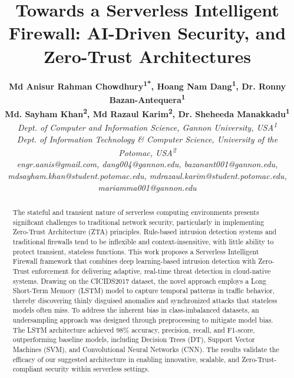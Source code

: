 \documentclass[conference]{IEEEtran}
\begin{document}
\title{Towards a Serverless Intelligent Firewall: AI-Driven Security, and Zero-Trust Architectures}

\author{
\centering
\begin{tabular}{c}
\textbf{Md Anisur Rahman Chowdhury\textsuperscript{1*}, Hoang Nam Dang\textsuperscript{1}, Dr. Ronny Bazan-Antequera\textsuperscript{1}} \\
\textbf{Md. Sayham Khan\textsuperscript{2}, Md Razaul Karim\textsuperscript{2}, Dr. Sheheeda Manakkadu\textsuperscript{1}} \\[6pt]
\textit{Dept. of Computer and Information Science, Gannon University, USA\textsuperscript{1}} \\
\textit{Dept. of Information Technology \& Computer Science, University of the Potomac, USA\textsuperscript{2}} \\[10pt]
\textit{\small engr.aanis@gmail.com, dang004@gannon.edu, bazanant001@gannon.edu,}\\
\textit{\small mdsayham.khan@student.potomac.edu, mdrazaul.karim@student.potomac.edu, mariamma001@gannon.edu}
\end{tabular}
}


\maketitle

\begin{abstract}
The stateful and transient nature of serverless computing environments presents significant challenges to traditional network security, particularly in implementing Zero-Trust Architecture (ZTA) principles. Rule-based intrusion detection systems and traditional firewalls tend to be inflexible and context-insensitive, with little ability to protect transient, stateless functions. This work proposes a Serverless Intelligent Firewall framework that combines deep learning-based intrusion detection with Zero-Trust enforcement for delivering adaptive, real-time threat detection in cloud-native systems. Drawing on the CICIDS2017 dataset, the novel approach employs a Long Short-Term Memory (LSTM) model to capture temporal patterns in traffic behavior, thereby discovering thinly disguised anomalies and synchronized attacks that stateless models often miss. To address the inherent bias in class-imbalanced datasets, an undersampling approach was designed through preprocessing to mitigate model bias. The LSTM architecture achieved 98\% accuracy, precision, recall, and F1-score, outperforming baseline models, including Decision Trees (DT), Support Vector Machines (SVM), and Convolutional Neural Networks (CNN). The results validate the efficacy of our suggested architecture in enabling innovative, scalable, and Zero-Trust-compliant security within serverless settings.



\end{abstract}
\end{document}
